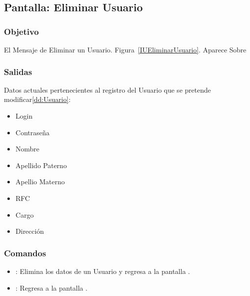 \subsection{Pantalla: Eliminar Usuario}
\subsubsection{Objetivo}
El Mensaje de Eliminar un Usuario. Figura~\ref{IUEliminarUsuario}. Aparece Sobre 



\subsubsection{Salidas}
Datos actuales pertenecientes al registro del Usuario que se pretende modificar\ref{dd:Usuario}:
\begin{itemize}
 \item Login
 \item Contraseña
 \item Nombre
 \item Apellido Paterno
 \item Apellio Materno
 \item RFC
 \item Cargo
 \item Dirección
\end{itemize}

\subsubsection{Comandos}
\begin{itemize}
 \item {}: Elimina los datos de un Usuario y regresa a la pantalla .
 \item {}: Regresa a la pantalla .
\end{itemize}






